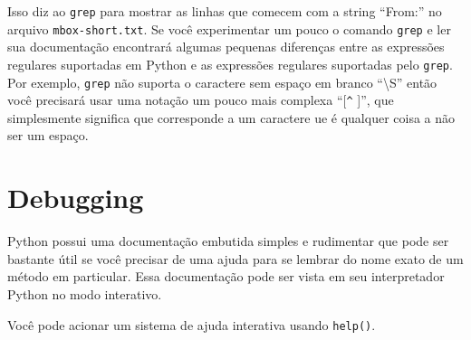 Isso diz ao {\tt grep} para mostrar as linhas que comecem com a string ``From:'' no arquivo
{\tt mbox-short.txt}. Se você experimentar um pouco o comando {\tt grep} e ler sua documentação 
encontrará algumas pequenas diferenças entre as expressões regulares suportadas em Python e as 
expressões regulares suportadas pelo {\tt grep}. Por exemplo, {\tt grep} não suporta o 
caractere sem espaço em branco ``{\textbackslash}S'' então você precisará usar uma notação um 
pouco mais complexa ``[\verb"^" ]'', que simplesmente significa que corresponde a um caractere 
ue é qualquer coisa a não ser um espaço.

\section{Debugging}

Python possui uma documentação embutida simples e rudimentar que pode ser bastante útil se
você precisar de uma ajuda para se lembrar do nome exato de um método em particular.
Essa documentação pode ser vista em seu interpretador Python no modo interativo. 

Você pode acionar um sistema de ajuda interativa usando {\tt help()}.


